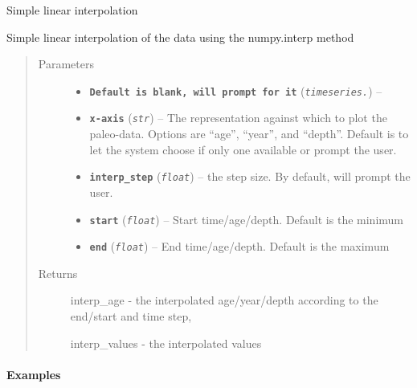 \documentclass[letterpaper,10pt,english]{sphinxmanual}
\begin{document}

\begin{fulllineitems}
\label{Main:pyleoclim.TSinterp}
Simple linear interpolation

Simple linear interpolation of the data using the numpy.interp method
\begin{quote}\begin{description}
\item[{Parameters}] \leavevmode\begin{itemize}
\item {} 
\textbf{\texttt{Default is blank, will prompt for it}} (\emph{\texttt{timeseries.}}) -- 

\item {} 
\textbf{\texttt{x-axis}} (\emph{\texttt{str}}) -- The representation against which to plot the paleo-data.
Options are ``age'', ``year'', and ``depth''. Default is to let the
system choose if only one available or prompt the user.

\item {} 
\textbf{\texttt{interp\_step}} (\emph{\texttt{float}}) -- the step size. By default, will prompt the user.

\item {} 
\textbf{\texttt{start}} (\emph{\texttt{float}}) -- Start time/age/depth. Default is the minimum

\item {} 
\textbf{\texttt{end}} (\emph{\texttt{float}}) -- End time/age/depth. Default is the maximum

\end{itemize}

\item[{Returns}] \leavevmode

interp\_age - the interpolated age/year/depth according to the end/start
and time step,

interp\_values - the interpolated values


\end{description}\end{quote}
\paragraph{Examples}


\end{fulllineitems}
\end{document}

